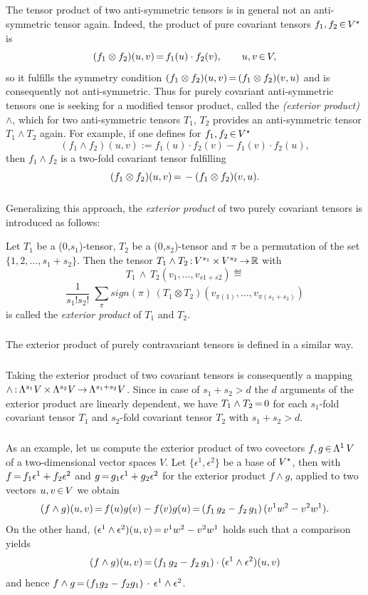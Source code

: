 \documentclass[11pt,twoside]{article}
\begin{document}
\subparagraph{}
The tensor product of two anti-symmetric tensors is in general 
not an anti-symmetric tensor again.
Indeed,
the product of pure covariant tensors $f_1,f_2 {\,\in\,} V^\star$ is
\[
(f_1 \otimes f_2) (u,v) {\,=\,} f_1(u) \cdot f_2(v), \qquad u,v {\,\in\,} V,
\]
so it fulfills the symmetry condition
$(f_1 \otimes f_2) (u,v) {\,=\,} (f_1 \otimes f_2) (v,u)$
and is consequently not anti-symmetric.
Thus for purely covariant anti-symmetric tensors
one is seeking for a modified tensor product,
called the \textit{(exterior product)} $\wedge$, 
which for two anti-symmetric tensors $T_1$, $T_2$ provides 
an anti-symmetric tensor $T_1 \wedge T_2$ again.
For example,
if one defines for $f_1, f_2 {\,\in\,} V^\star$
\[
(f_1 \wedge f_2) (u,v) := f_1(u) \cdot f_2(v) - f_1(v) \cdot f_2(u),
\]
then $f_1 \wedge f_2$ is a two-fold covariant tensor fulfilling
\[
(f_1 \otimes f_2)(u,v) {\,=\,} - (f_1 \otimes f_2)(v,u).
\]

\subparagraph{}
Generalizing this approach,
the \textit{exterior product} of two purely covariant tensors
is introduced as follows:

\begin{definition}
Let $T_1$ be a (0,$s_1$)-tensor,
$T_2$ be a (0,$s_2$)-tensor and
$\pi$ be a permutation of the set $\{1,2,\ldots,s_1+s_2\}$.
Then the tensor $T_1 \wedge T_2{\,:\,} V^{s_1} {\,\times\,} V^{s_2} {\,\to\,} {\mathbb{R}}$ with
\[
T_1 \, \wedge \, T_2(v_1,\ldots,v_{s1+s2}) \eqdef 
\]
\[
\frac{1}{s_1! s_2!} \; \sum_{\pi} sign(\pi) \,
(T_1 \otimes T_2) (v_{\pi(1)},\ldots,v_{\pi(s_1+s_2)})
\]
is called the \textit{exterior product} of $T_1$ and $T_2$.
\end{definition}

\subparagraph{}
The exterior product of purely contravariant tensors is defined
in a similar way.

\subparagraph{}
Taking the exterior product of two covariant tensors is consequently a mapping 
$\wedge {\,:\,} \Lambda^{s_1} V {\,\times\,} \Lambda^{s_2} V {\,\to\,} \Lambda^{s_1+s_2} V$. 
Since in case of $s_1 + s_2 > d$ the $d$ arguments of the exterior product
are linearly dependent,
we have $T_1 \wedge T_2 {\,=\,} 0$
for each $s_1$-fold covariant tensor $T_1$
and $s_2$-fold covariant tensor $T_2$ with $s_1 + s_2 > d$.

\subparagraph{}
As an example,
let us compute the exterior product of two covectors 
$f,g {\,\in\,} \Lambda^1 \, V$ of a two-dimensional vector spaces $V$.
Let $\{\epsilon^1,\epsilon^2\}$ be a base of $V^\star$,
then with $f {\,=\,} f_1 \epsilon^1 + f_2 \epsilon^2$ and
$g {\,=\,} g_1 \epsilon^1 + g_2 \epsilon^2$ for the exterior product $f \wedge g$,
applied to two vectors $u,v {\,\in\,} V$ we obtain
\[
(f \wedge g)(u,v) {\,=\,} f(u)g(v) - f(v)g(u) {\,=\,} 
(f_1 \, g_2 - f_2 \, g_1) \, (v^1 w^2 - v^2 w^1).
\]
On the other hand,
$(\epsilon^1 \wedge \epsilon^2)(u,v) {\,=\,} v^1 w^2 - v^2 w^1$ holds
such that a comparison yields
\[
(f \wedge g)(u,v) {\,=\,} (f_1 \, g_2 - f_2 \, g_1) \cdot 
(\epsilon^1 \wedge \epsilon^2)(u,v)
\]
and hence
$f \wedge g {\,=\,} (f_1 g_2 - f_2 g_1) \, \cdot \, \epsilon^1 \wedge \epsilon^2$.
\end{document}
